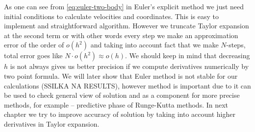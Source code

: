 \documentclass[10pt]{article}
\begin{document}
As one can see from \ref{eq:euler-two-body} in Euler's explicit method we just need initial conditions to calculate velocities and coordinates. This is  easy to implement and straightforward algorithm. However we truncate Taylor expansion at the second term or with other words every step we make an approximation error of the order of $o(h^2)$ and taking into account fact that we make $N$-steps, total error goes like $N\cdot o(h^2)\approx o(h)$.
We should keep in mind that decreasing $h$ is not always gives us better precision if we compute derivatives numerically by two point formula.
We will later show that Euler method is not stable for our calculations (SSILKA NA RESULTS), however method is important due to it can be used to check general view of solution and as a component for more precise methods, for example -- predictive phase of Runge-Kutta methods.
In next chapter we try to improve accuracy of solution by taking into account higher derivatives in Taylor expansion.
\end{document}
